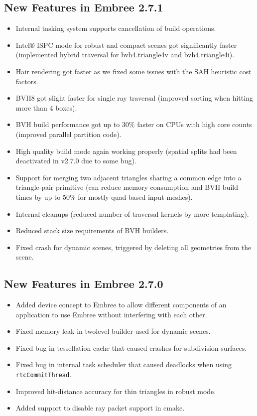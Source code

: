 \subsection{New Features in Embree
2.7.1}\label{new-features-in-embree-2.7.1}

\begin{itemize}
\tightlist
\item
  Internal tasking system supports cancellation of build operations.
\item
  Intel® ISPC mode for robust and compact scenes got significantly
  faster (implemented hybrid traversal for bvh4.triangle4v and
  bvh4.triangle4i).
\item
  Hair rendering got faster as we fixed some issues with the SAH
  heuristic cost factors.
\item
  BVH8 got slight faster for single ray traversal (improved sorting when
  hitting more than 4 boxes).
\item
  BVH build performance got up to 30\% faster on CPUs with high core
  counts (improved parallel partition code).
\item
  High quality build mode again working properly (spatial splits had
  been deactivated in v2.7.0 due to some bug).
\item
  Support for merging two adjacent triangles sharing a common edge into
  a triangle-pair primitive (can reduce memory consumption and BVH build
  times by up to 50\% for mostly quad-based input meshes).
\item
  Internal cleanups (reduced number of traversal kernels by more
  templating).
\item
  Reduced stack size requirements of BVH builders.
\item
  Fixed crash for dynamic scenes, triggered by deleting all geometries
  from the scene.
\end{itemize}

\subsection{New Features in Embree
2.7.0}\label{new-features-in-embree-2.7.0}

\begin{itemize}
\tightlist
\item
  Added device concept to Embree to allow different components of an
  application to use Embree without interfering with each other.
\item
  Fixed memory leak in twolevel builder used for dynamic scenes.
\item
  Fixed bug in tessellation cache that caused crashes for subdivision
  surfaces.
\item
  Fixed bug in internal task scheduler that caused deadlocks when using
  \texttt{rtcCommitThread}.
\item
  Improved hit-distance accuracy for thin triangles in robust mode.
\item
  Added support to disable ray packet support in cmake.
\end{itemize}

